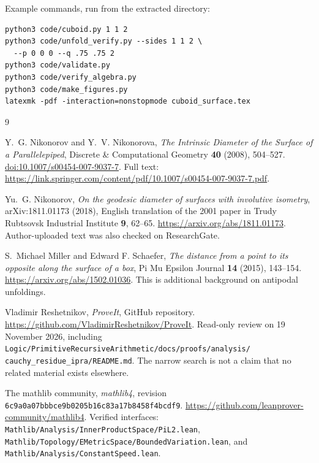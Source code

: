 \documentclass[11pt]{article}
\theoremstyle{definition}
\begin{document}
Example commands, run from the extracted directory:
\begin{lstlisting}
python3 code/cuboid.py 1 1 2
python3 code/unfold_verify.py --sides 1 1 2 \
  --p 0 0 0 --q .75 .75 2
python3 code/validate.py
python3 code/verify_algebra.py
python3 code/make_figures.py
latexmk -pdf -interaction=nonstopmode cuboid_surface.tex
\end{lstlisting}

\begingroup
\small\raggedright
\begin{thebibliography}{9}

Y.~G. Nikonorov and Y.~V. Nikonorova,
\emph{The Intrinsic Diameter of the Surface of a Parallelepiped},
Discrete \& Computational Geometry \textbf{40} (2008), 504--527.
\href{https://doi.org/10.1007/s00454-007-9037-7}
{doi:10.1007/s00454-007-9037-7}.
Full text:
\url{https://link.springer.com/content/pdf/10.1007/s00454-007-9037-7.pdf}.

Yu.~G. Nikonorov,
\emph{On the geodesic diameter of surfaces with involutive isometry},
arXiv:1811.01173 (2018), English translation of the 2001 paper in
Trudy Rubtsovsk Industrial Institute \textbf{9}, 62--65.
\url{https://arxiv.org/abs/1811.01173}.
Author-uploaded text was also checked on ResearchGate.

S.~Michael Miller and Edward F. Schaefer,
\emph{The distance from a point to its opposite along the surface of a box},
Pi Mu Epsilon Journal \textbf{14} (2015), 143--154.
\url{https://arxiv.org/abs/1502.01036}.
This is additional background on antipodal unfoldings.

Vladimir Reshetnikov, \emph{ProveIt}, GitHub repository.
\url{https://github.com/VladimirReshetnikov/ProveIt}.
Read-only review on 19 November 2026, including
\texttt{Logic/PrimitiveRecursiveArithmetic/docs/proofs/analysis/}
\texttt{cauchy\_residue\_ipra/README.md}.
The narrow search is not a claim that no related material exists elsewhere.

The mathlib community, \emph{mathlib4}, revision
\texttt{6c9a0a07bbbce9b0205b16c83a17b8458f4bcdf9}.
\url{https://github.com/leanprover-community/mathlib4}.
Verified interfaces:
\texttt{Mathlib/Analysis/InnerProductSpace/PiL2.lean},
\texttt{Mathlib/Topology/EMetricSpace/BoundedVariation.lean},
and \texttt{Mathlib/Analysis/ConstantSpeed.lean}.

\end{thebibliography}
\endgroup
\end{document}
